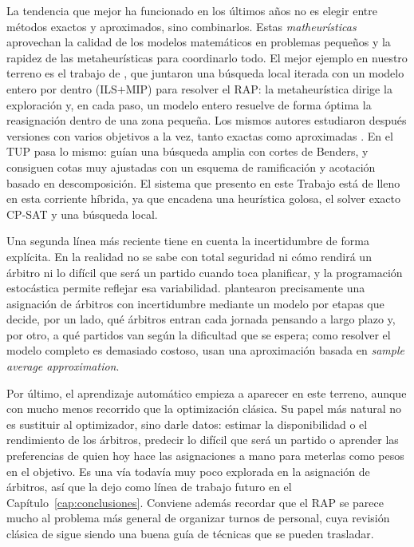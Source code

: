 \documentclass[11pt,a4paper,spanish]{book}
\numberwithin{equation}{chapter}
\numberwithin{figure}{chapter}
\numberwithin{table}{chapter}
\begin{document}
La tendencia que mejor ha funcionado en los últimos años no es elegir entre métodos exactos y aproximados, sino combinarlos. Estas \emph{matheurísticas} aprovechan la calidad de los modelos matemáticos en problemas pequeños y la rapidez de las metaheurísticas para coordinarlo todo. El mejor ejemplo en nuestro terreno es el trabajo de , que juntaron una búsqueda local iterada con un modelo entero por dentro (ILS$+$MIP) para resolver el RAP: la metaheurística dirige la exploración y, en cada paso, un modelo entero resuelve de forma óptima la reasignación dentro de una zona pequeña. Los mismos autores estudiaron después versiones con varios objetivos a la vez, tanto exactas como aproximadas \cite{duarte2008multiobjective}. En el TUP pasa lo mismo:  guían una búsqueda amplia con cortes de Benders, y  consiguen cotas muy ajustadas con un esquema de ramificación y acotación basado en descomposición. El sistema que presento en este Trabajo está de lleno en esta corriente híbrida, ya que encadena una heurística golosa, el solver exacto CP-SAT y una búsqueda local.

Una segunda línea más reciente tiene en cuenta la incertidumbre de forma explícita. En la realidad no se sabe con total seguridad ni cómo rendirá un árbitro ni lo difícil que será un partido cuando toca planificar, y la programación estocástica permite reflejar esa variabilidad.  plantearon precisamente una asignación de árbitros con incertidumbre mediante un modelo por etapas que decide, por un lado, qué árbitros entran cada jornada pensando a largo plazo y, por otro, a qué partidos van según la dificultad que se espera; como resolver el modelo completo es demasiado costoso, usan una aproximación basada en \emph{sample average approximation}.

Por último, el aprendizaje automático empieza a aparecer en este terreno, aunque con mucho menos recorrido que la optimización clásica. Su papel más natural no es sustituir al optimizador, sino darle datos: estimar la disponibilidad o el rendimiento de los árbitros, predecir lo difícil que será un partido o aprender las preferencias de quien hoy hace las asignaciones a mano para meterlas como pesos en el objetivo. Es una vía todavía muy poco explorada en la asignación de árbitros, así que la dejo como línea de trabajo futuro en el Capítulo~\ref{cap:conclusiones}. Conviene además recordar que el RAP se parece mucho al problema más general de organizar turnos de personal, cuya revisión clásica de  sigue siendo una buena guía de técnicas que se pueden trasladar.
\end{document}
